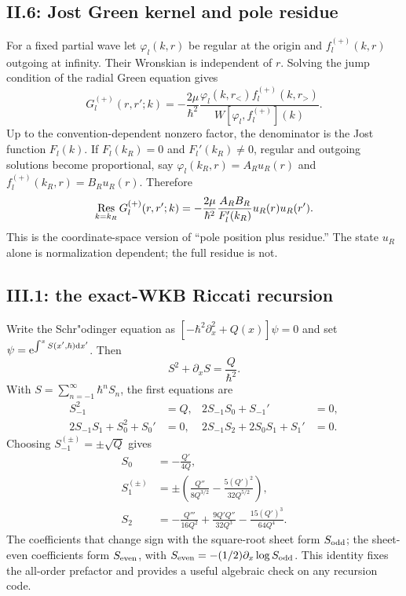 \subsection*{II.6: Jost Green kernel and pole residue}

For a fixed partial wave let $\varphi_l(k,r)$ be regular at the origin and
$f_l^{(+)}(k,r)$ outgoing at infinity.  Their Wronskian is independent of
$r$.  Solving the jump condition of the radial Green equation gives
\begin{equation}
  G_l^{(+)}(r,r';k)
  =-\frac{2\mu}{\hbar^2}
  \frac{\varphi_l(k,r_<)f_l^{(+)}(k,r_>)}
       {W[\varphi_l,f_l^{(+)}](k)}.
\end{equation}
Up to the convention-dependent nonzero factor, the denominator is the Jost
function $F_l(k)$.  If $F_l(k_R)=0$ and $F_l'(k_R)\ne0$, regular and outgoing
solutions become proportional, say $\varphi_l(k_R,r)=A_Ru_R(r)$ and
$f_l^{(+)}(k_R,r)=B_Ru_R(r)$.  Therefore
\begin{equation}
  \operatorname*{Res}_{k=k_R}G_l^{(+)}(r,r';k)
  =-\frac{2\mu}{\hbar^2}
  \frac{A_RB_R}{F_l'(k_R)}u_R(r)u_R(r').
\end{equation}
This is the coordinate-space version of ``pole position plus residue.''  The
state $u_R$ alone is normalization dependent; the full residue is not.

\subsection*{III.1: the exact-WKB Riccati recursion}

Write the Schr"odinger equation as
$[-\hbar^2\partial_x^2+Q(x)]\psi=0$ and set
$\psi=\mathrm{e}^{\int^xS(x',\hbar)\mathrm{d} x'}$.  Then
\begin{equation}
  S^2+\partial_xS=\frac{Q}{\hbar^2}.
\end{equation}
With $S=\sum_{n=-1}^{\infty}\hbar^nS_n$, the first equations are
\begin{align}
  S_{-1}^2&=Q,
  &2S_{-1}S_0+S_{-1}'&=0,
  \\
  2S_{-1}S_1+S_0^2+S_0'&=0,
  &2S_{-1}S_2+2S_0S_1+S_1'&=0.
\end{align}
Choosing $S_{-1}^{(\pm)}=\pm\sqrt Q$ gives
\begin{align}
  S_0&=-\frac{Q'}{4Q},
  \\
  S_1^{(\pm)}&=\pm
  \left(\frac{Q''}{8Q^{3/2}}
  -\frac{5(Q')^2}{32Q^{5/2}}\right),
  \\
  S_2&=-\frac{Q'''}{16Q^2}
  +\frac{9Q'Q''}{32Q^3}
  -\frac{15(Q')^3}{64Q^4}.
\end{align}
The coefficients that change sign with the square-root sheet form
$S_{\mathrm{odd}}$; the sheet-even coefficients form $S_{\mathrm{even}}$, with
$S_{\mathrm{even}}=-(1/2)\partial_x\log S_{\mathrm{odd}}$.  This identity fixes the
all-order prefactor and provides a useful algebraic check on any recursion
code.

